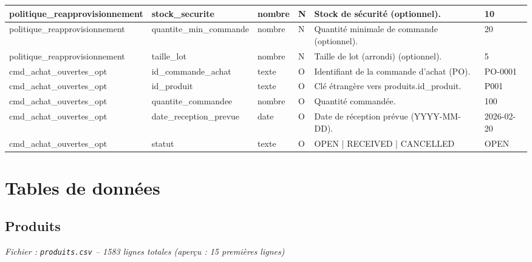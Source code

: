 \documentclass[a4paper,11pt]{article}
\begin{document}
\begin{longtable}{|l|l|l|l|l|l|}
\rowcolor{rowgray} politique\_reapprovisionnement & stock\_securite & nombre & N & Stock de sécurité (optionnel). & 10 \\ \hline
 politique\_reapprovisionnement & quantite\_min\_commande & nombre & N & Quantité minimale de commande (optionnel). & 20 \\ \hline
\rowcolor{rowgray} politique\_reapprovisionnement & taille\_lot & nombre & N & Taille de lot (arrondi) (optionnel). & 5 \\ \hline
 cmd\_achat\_ouvertes\_opt & id\_commande\_achat & texte & O & Identifiant de la commande d'achat (PO). & PO-0001 \\ \hline
\rowcolor{rowgray} cmd\_achat\_ouvertes\_opt & id\_produit & texte & O & Clé étrangère vers produits.id\_produit. & P001 \\ \hline
 cmd\_achat\_ouvertes\_opt & quantite\_commandee & nombre & O & Quantité commandée. & 100 \\ \hline
\rowcolor{rowgray} cmd\_achat\_ouvertes\_opt & date\_reception\_prevue & date & O & Date de réception prévue (YYYY-MM-DD). & 2026-02-20 \\ \hline
 cmd\_achat\_ouvertes\_opt & statut & texte & O & OPEN | RECEIVED | CANCELLED & OPEN \\ \hline
\end{longtable}
\normalsize

\newpage

\section{Tables de données}


\subsection{Produits}

\textit{Fichier : \texttt{produits.csv} -- 1583 lignes totales
 (aperçu : 15 premières lignes)
}
\end{document}
